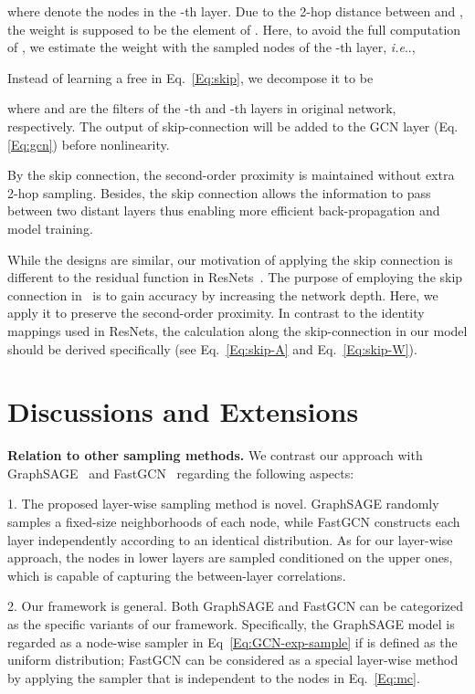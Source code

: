\documentclass{article}
\makeatletter
\DeclareRobustCommand\onedot{\futurelet\@let@token\@onedot}
\def\@onedot{\ifx\@let@token.\else.\null\fi\xspace}
\def\ie{\emph{i.e}\onedot} \def\Ie{\emph{I.e}\onedot}
\makeatother
\begin{document}
\vskip -0.1in
where  denote the nodes in the -th layer. Due to the 2-hop distance between  and , the weight  is supposed to be the element of .
Here, to avoid the full computation of , we estimate the weight with the sampled nodes of the -th layer, \ie,
\vskip -0.2in

\vskip -0.1in
Instead of learning a free  in Eq.~\eqref{Eq:skip}, we decompose it to be
\vskip -0.2in

\vskip -0.1in
where  and  are the filters of the -th and -th layers in original network, respectively. The output of skip-connection will be added to the GCN layer (Eq.\eqref{Eq:gcn}) before nonlinearity.

By the skip connection, the second-order proximity is maintained without extra 2-hop sampling. Besides,
the skip connection allows the information to pass between two distant layers thus enabling more efficient back-propagation and model training.

While the designs are similar, our motivation of applying the skip connection is different to the residual function in ResNets~\cite{he2016deep}.
The purpose of employing the skip connection in~\cite{he2016deep} is to gain accuracy by increasing the network depth. Here, we apply it to preserve the second-order proximity. In contrast to the identity mappings used in ResNets, the calculation along the skip-connection in our model should be derived specifically (see Eq.~\eqref{Eq:skip-A} and Eq.~\eqref{Eq:skip-W}).






\section{Discussions and Extensions}
\label{Sec:comparison}


\textbf{Relation to other sampling methods.}
We contrast our approach with GraphSAGE~\cite{hamilton2017inductive} and FastGCN~\cite{chen2018fastgcn} regarding the following aspects:

1. The proposed layer-wise sampling method is novel. GraphSAGE randomly samples a fixed-size neighborhoods of each node, while FastGCN constructs each layer independently according to an identical distribution. As for our layer-wise approach, the nodes in lower layers are sampled conditioned on the upper ones, which is capable of capturing the between-layer correlations.

2. Our framework is general. Both GraphSAGE and FastGCN can be categorized as the specific variants of our framework.
Specifically, the GraphSAGE model is regarded as a node-wise sampler in Eq~\eqref{Eq:GCN-exp-sample} if  is defined as the uniform distribution; FastGCN can be considered as a special layer-wise method by applying the sampler  that is independent to the nodes  in Eq.~\eqref{Eq:mc}.
\end{document}
